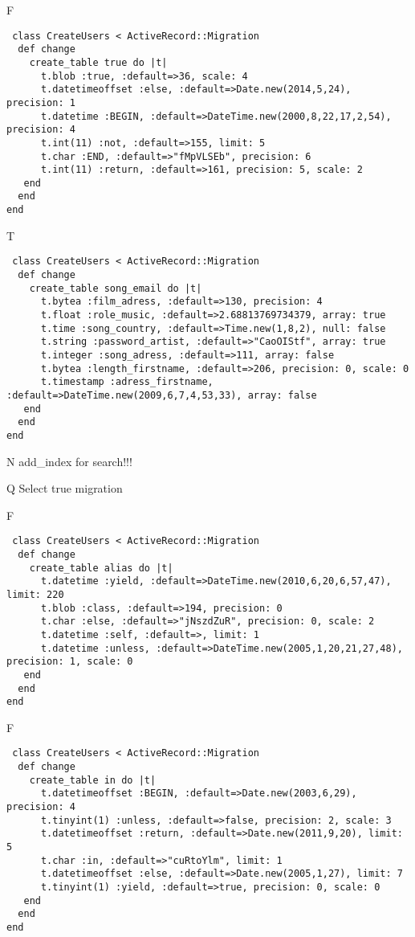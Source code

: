 F
\begin{verbatim}
 class CreateUsers < ActiveRecord::Migration 
  def change 
    create_table true do |t| 
      t.blob :true, :default=>36, scale: 4
      t.datetimeoffset :else, :default=>Date.new(2014,5,24), precision: 1
      t.datetime :BEGIN, :default=>DateTime.new(2000,8,22,17,2,54), precision: 4
      t.int(11) :not, :default=>155, limit: 5
      t.char :END, :default=>"fMpVLSEb", precision: 6
      t.int(11) :return, :default=>161, precision: 5, scale: 2
   end 
  end 
end
\end{verbatim}

T
\begin{verbatim}
 class CreateUsers < ActiveRecord::Migration 
  def change 
    create_table song_email do |t| 
      t.bytea :film_adress, :default=>130, precision: 4
      t.float :role_music, :default=>2.68813769734379, array: true
      t.time :song_country, :default=>Time.new(1,8,2), null: false
      t.string :password_artist, :default=>"CaoOIStf", array: true
      t.integer :song_adress, :default=>111, array: false
      t.bytea :length_firstname, :default=>206, precision: 0, scale: 0
      t.timestamp :adress_firstname, :default=>DateTime.new(2009,6,7,4,53,33), array: false
   end 
  end 
end
\end{verbatim}
N
add_index for search!!!
  
Q
Select true migration

F
\begin{verbatim}
 class CreateUsers < ActiveRecord::Migration 
  def change 
    create_table alias do |t| 
      t.datetime :yield, :default=>DateTime.new(2010,6,20,6,57,47), limit: 220
      t.blob :class, :default=>194, precision: 0
      t.char :else, :default=>"jNszdZuR", precision: 0, scale: 2
      t.datetime :self, :default=>, limit: 1
      t.datetime :unless, :default=>DateTime.new(2005,1,20,21,27,48), precision: 1, scale: 0
   end 
  end 
end
\end{verbatim}

F
\begin{verbatim}
 class CreateUsers < ActiveRecord::Migration 
  def change 
    create_table in do |t| 
      t.datetimeoffset :BEGIN, :default=>Date.new(2003,6,29), precision: 4
      t.tinyint(1) :unless, :default=>false, precision: 2, scale: 3
      t.datetimeoffset :return, :default=>Date.new(2011,9,20), limit: 5
      t.char :in, :default=>"cuRtoYlm", limit: 1
      t.datetimeoffset :else, :default=>Date.new(2005,1,27), limit: 7
      t.tinyint(1) :yield, :default=>true, precision: 0, scale: 0
   end 
  end 
end
\end{verbatim}

